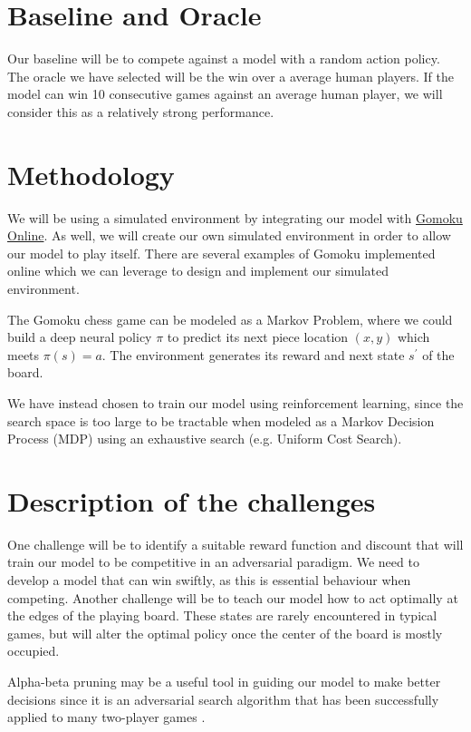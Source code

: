 \documentclass[conference]{IEEEtran}
\begin{document}
\section{Baseline and Oracle}
Our baseline will be to compete against a model with a random action policy. The oracle we have selected will be the win over a average human players. If the model can win 10 consecutive games against an average human player, we will consider this as a relatively strong performance.

\section{Methodology}
We will be using a simulated environment by integrating our model with \href{https://gomokuonline.com}{Gomoku Online}. As well, we will create our own simulated environment in order to allow our model to play itself. There are several examples of Gomoku implemented online which we can leverage to design and implement our simulated environment.

The Gomoku chess game can be modeled as a Markov Problem, where we could build a deep neural policy $\pi$ to predict its next piece location $(x, y)$ which meets $\pi(s) = a$. The environment generates its reward and next state $s^\prime$ of the board.

We have instead chosen to train our model using reinforcement learning, since the search space is too large to be tractable when modeled as a Markov Decision Process (MDP) using an exhaustive search (e.g. Uniform Cost Search).

\section{Description of the challenges}
One challenge will be to identify a suitable reward function and discount that will train our model to be competitive in an adversarial paradigm. We need to develop a model that can win swiftly, as this is essential behaviour when competing. Another challenge will be to teach our model how to act optimally at the edges of the playing board. These states are rarely encountered in typical games, but will alter the optimal policy once the center of the board is mostly occupied.

Alpha-beta pruning may be a useful tool in guiding our model to make better decisions since it is an adversarial search algorithm that has been successfully applied to many two-player games \cite{b4}.
\end{document}
